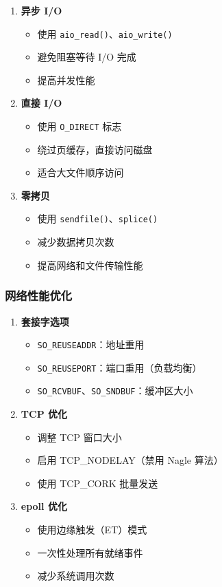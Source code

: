 \begin{enumerate}
  \item \textbf{异步 I/O}
    \begin{itemize}
      \item 使用 \texttt{aio\_read()}、\texttt{aio\_write()}
      \item 避免阻塞等待 I/O 完成
      \item 提高并发性能
    \end{itemize}

  \item \textbf{直接 I/O}
    \begin{itemize}
      \item 使用 \texttt{O\_DIRECT} 标志
      \item 绕过页缓存，直接访问磁盘
      \item 适合大文件顺序访问
    \end{itemize}

  \item \textbf{零拷贝}
    \begin{itemize}
      \item 使用 \texttt{sendfile()}、\texttt{splice()}
      \item 减少数据拷贝次数
      \item 提高网络和文件传输性能
    \end{itemize}
\end{enumerate}

\subsubsection{网络性能优化}

\begin{enumerate}
  \item \textbf{套接字选项}
    \begin{itemize}
      \item \texttt{SO\_REUSEADDR}：地址重用
      \item \texttt{SO\_REUSEPORT}：端口重用（负载均衡）
      \item \texttt{SO\_RCVBUF}、\texttt{SO\_SNDBUF}：缓冲区大小
    \end{itemize}

  \item \textbf{TCP 优化}
    \begin{itemize}
      \item 调整 TCP 窗口大小
      \item 启用 TCP\_NODELAY（禁用 Nagle 算法）
      \item 使用 TCP\_CORK 批量发送
    \end{itemize}

  \item \textbf{epoll 优化}
    \begin{itemize}
      \item 使用边缘触发（ET）模式
      \item 一次性处理所有就绪事件
      \item 减少系统调用次数
    \end{itemize}
\end{enumerate}

